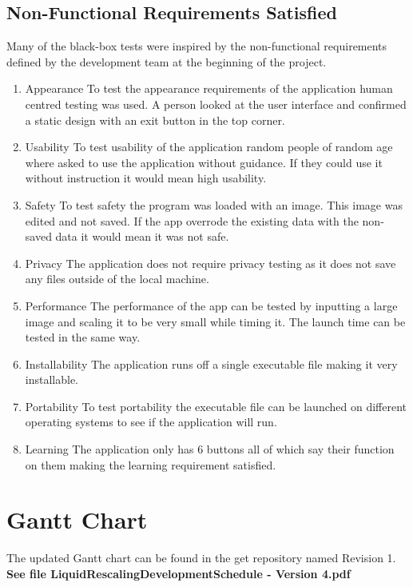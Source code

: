 \documentclass{article}
\begin{document}
\subsection{Non-Functional Requirements Satisfied}
Many of the black-box tests were inspired by the non-functional requirements defined by the development team at the beginning of the project. 
\begin{enumerate}

\item Appearance
    To test the appearance requirements of the application human centred testing was used. A person looked at the user interface and confirmed a static design with an exit button in the top corner.
\item Usability
    To test usability of the application random people of random age where asked to use the application without guidance. If they could use it without instruction it would mean high usability. 
\item Safety
    To test safety the program was loaded with an image. This image was edited and not saved. If the app overrode the existing data with the non-saved data it would mean it was not safe. 
\item Privacy
    The application does not require privacy testing as it does not save any files outside of the local machine.
\item Performance
    The performance of the app can be tested by inputting a large image and scaling it to be very small while timing it. The launch time can be tested in the same way.
\item Installability
    The application runs off a single executable file making it very installable.
\item Portability
    To test portability the executable file can be launched on different operating systems to see if the application will run.
\item Learning
    The application only has 6 buttons all of which say their function on them making the learning requirement satisfied.

\end{enumerate}

\section{Gantt Chart}
The updated Gantt chart can be found in the get repository named Revision 1. \textbf{See file LiquidRescalingDevelopmentSchedule - Version 4.pdf}
\end{document}
